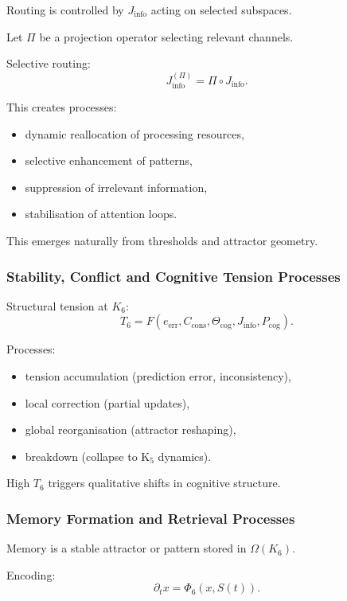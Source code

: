 Routing is controlled by $J_{\text{info}}$ acting on selected subspaces.

Let $\Pi$ be a projection operator selecting relevant channels.

Selective routing:
\[
J_{\text{info}}^{(\Pi)} = \Pi \circ J_{\text{info}}.
\]

This creates processes:
\begin{itemize}
    \item dynamic reallocation of processing resources,
    \item selective enhancement of patterns,
    \item suppression of irrelevant information,
    \item stabilisation of attention loops.
\end{itemize}

This emerges naturally from thresholds and attractor geometry.

\subsubsection{Stability, Conflict and Cognitive Tension Processes}

Structural tension at $K_6$:
\[
T_6 = F(e_{\mathrm{err}}, C_{\text{cons}}, \Theta_{\text{cog}}, J_{\text{info}}, P_{\text{cog}}).
\]

Processes:
\begin{itemize}
    \item tension accumulation (prediction error, inconsistency),
    \item local correction (partial updates),
    \item global reorganisation (attractor reshaping),
    \item breakdown (collapse to K$_5$ dynamics).
\end{itemize}

High $T_6$ triggers qualitative shifts in cognitive structure.

\subsubsection{Memory Formation and Retrieval Processes}

Memory is a stable attractor or pattern stored in $\Omega(K_6)$.

Encoding:
\[
\partial_t x = \Phi_6(x, S(t)).
\]

